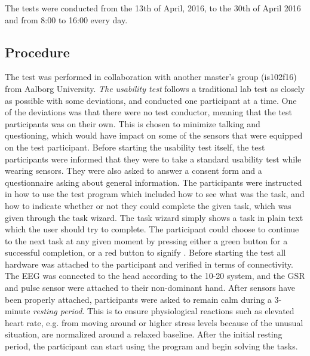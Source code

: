 The tests were conducted from the 13th of April, 2016, to the 30th of April 2016 and from 8:00 to 16:00 every day. 

\subsection{Procedure}
The test was performed in collaboration with another master's group (is102f16) from Aalborg University.
\textit{The usability test} follows a traditional lab test as closely as possible with some deviations, and conducted one participant at a time. 
One of the deviations was that there were no test conductor, meaning that the test participants was on their own. This is chosen to minimize talking and questioning, which would have impact on some of the sensors that were equipped on the test participant.
Before starting the usability test itself, the test participants were informed that they were to take a standard usability test while wearing sensors.
They were also asked to answer a consent form and a questionnaire asking about general information.  
The participants were instructed in how to use the test program which included how to see what was the task, and how to indicate whether or not they
could complete the given task, which was given through the task wizard. The task wizard simply shows a task in plain text which the user should try to complete. The participant could choose to continue to the next task at any given moment by pressing either a green button for a successful completion, or a red button to signify . 
Before starting the test all hardware was attached to the participant and verified in
terms of connectivity.  The EEG was connected to the head according to the 10-20 system\cite{eeg_tech_10_20}, and the
GSR and pulse sensor were attached to their non-dominant hand.
After sensors have been properly attached, participants were asked to remain calm during a 3-minute \textit{resting
  period}. This is to ensure physiological reactions such as elevated heart rate, e.g. from moving around or higher stress levels because of the unusual situation, are normalized around a relaxed baseline. After the initial resting period, the participant can start using the program and begin solving the tasks. 

